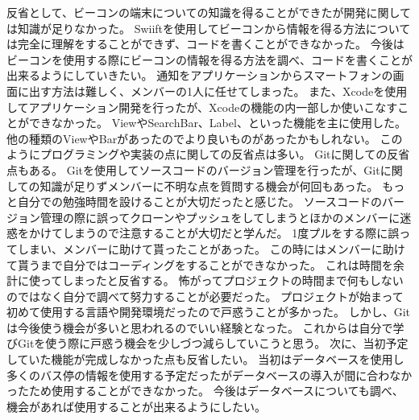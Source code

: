 \documentclass[openany,11pt,papersize]{jsbook}
\begin{document}
反省として、ビーコンの端末についての知識を得ることができたが開発に関しては知識が足りなかった。
Swiiftを使用してビーコンから情報を得る方法については完全に理解をすることができず、コードを書くことができなかった。
今後はビーコンを使用する際にビーコンの情報を得る方法を調べ、コードを書くことが出来るようにしていきたい。
通知をアプリケーションからスマートフォンの画面に出す方法は難しく、メンバーの1人に任せてしまった。
また、Xcodeを使用してアプリケーション開発を行ったが、Xcodeの機能の内一部しか使いこなすことができなかった。
ViewやSearchBar、Label、といった機能を主に使用した。
他の種類のViewやBarがあったのでより良いものがあったかもしれない。
このようにプログラミングや実装の点に関しての反省点は多い。
Gitに関しての反省点もある。
Gitを使用してソースコードのバージョン管理を行ったが、Gitに関しての知識が足りずメンバーに不明な点を質問する機会が何回もあった。
もっと自分での勉強時間を設けることが大切だったと感じた。
ソースコードのバージョン管理の際に誤ってクローンやプッシュをしてしまうとほかのメンバーに迷惑をかけてしまうので注意することが大切だと学んだ。
1度プルをする際に誤ってしまい、メンバーに助けて貰ったことがあった。
この時にはメンバーに助けて貰うまで自分ではコーディングをすることができなかった。
これは時間を余計に使ってしまったと反省する。
怖がってプロジェクトの時間まで何もしないのではなく自分で調べて努力することが必要だった。
プロジェクトが始まって初めて使用する言語や開発環境だったので戸惑うことが多かった。
しかし、Gitは今後使う機会が多いと思われるのでいい経験となった。
これからは自分で学びGitを使う際に戸惑う機会を少しづつ減らしていこうと思う。
次に、当初予定していた機能が完成しなかった点も反省したい。
当初はデータベースを使用し多くのバス停の情報を使用する予定だったがデータベースの導入が間に合わなかったため使用することができなかった。
今後はデータベースについても調べ、機会があれば使用することが出来るようにしたい。

\end{document}
